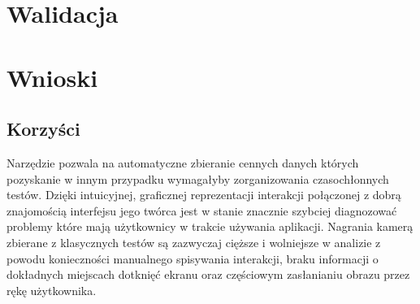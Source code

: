 \section{Walidacja}


\section{Wnioski}

\subsection{Korzyści}
Narzędzie pozwala na automatyczne zbieranie cennych danych których pozyskanie w innym przypadku wymagałyby zorganizowania czasochłonnych testów. Dzięki intuicyjnej, graficznej reprezentacji interakcji połączonej z dobrą znajomością interfejsu jego twórca jest w stanie znacznie szybciej diagnozować problemy które mają użytkownicy w trakcie używania aplikacji. Nagrania kamerą zbierane z klasycznych testów są zazwyczaj cięższe i wolniejsze w analizie z powodu konieczności manualnego spisywania interakcji, braku informacji o dokładnych miejscach dotknięć ekranu oraz częściowym zasłanianiu obrazu przez rękę użytkownika. 
